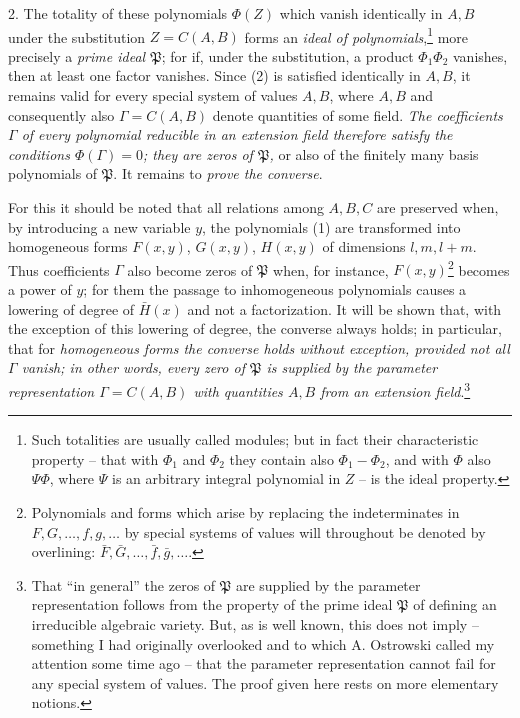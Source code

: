 \documentclass[11pt]{article}
\begin{document}
2. The totality of these polynomials $\Phi(Z)$ which vanish identically in $A,B$ under the substitution $Z=C(A,B)$ forms an \emph{ideal of polynomials},\footnote{Such totalities are usually called modules; but in fact their characteristic property -- that with $\Phi_1$ and $\Phi_2$ they contain also $\Phi_1-\Phi_2$, and with $\Phi$ also $\Psi\Phi$, where $\Psi$ is an arbitrary integral polynomial in $Z$ -- is the ideal property.} more precisely a \emph{prime ideal $\mathfrak P$}; for if, under the substitution, a product $\Phi_1\Phi_2$ vanishes, then at least one factor vanishes. Since (2) is satisfied identically in $A,B$, it remains valid for every special system of values $A,B$, where $A,B$ and consequently also $\Gamma=C(A,B)$ denote quantities of some field. \emph{The coefficients $\Gamma$ of every polynomial reducible in an extension field therefore satisfy the conditions $\Phi(\Gamma)=0$; they are zeros of $\mathfrak P$,} or also of the finitely many basis polynomials of $\mathfrak P$. It remains to \emph{prove the converse}.

For this it should be noted that all relations among $A,B,C$ are preserved when, by introducing a new variable $y$, the polynomials (1) are transformed into homogeneous forms $F(x,y)$, $G(x,y)$, $H(x,y)$ of dimensions $l,m,l+m$. Thus coefficients $\Gamma$ also become zeros of $\mathfrak P$ when, for instance, $F(x,y)$\footnote{Polynomials and forms which arise by replacing the indeterminates in $F,G,\ldots,f,g,\ldots$ by special systems of values will throughout be denoted by overlining: $\bar F,\bar G,\ldots,\bar f,\bar g,\ldots$.} becomes a power of $y$; for them the passage to inhomogeneous polynomials causes a lowering of degree of $\bar H(x)$ and not a factorization. It will be shown that, with the exception of this lowering of degree, the converse always holds; in particular, that for \emph{homogeneous forms the converse holds without exception, provided not all $\Gamma$ vanish; in other words, every zero of $\mathfrak P$ is supplied by the parameter representation $\Gamma=C(A,B)$ with quantities $A,B$ from an extension field}.\footnote{That ``in general'' the zeros of $\mathfrak P$ are supplied by the parameter representation follows from the property of the prime ideal $\mathfrak P$ of defining an irreducible algebraic variety. But, as is well known, this does not imply -- something I had originally overlooked and to which A. Ostrowski called my attention some time ago -- that the parameter representation cannot fail for any special system of values. The proof given here rests on more elementary notions.}
\end{document}
